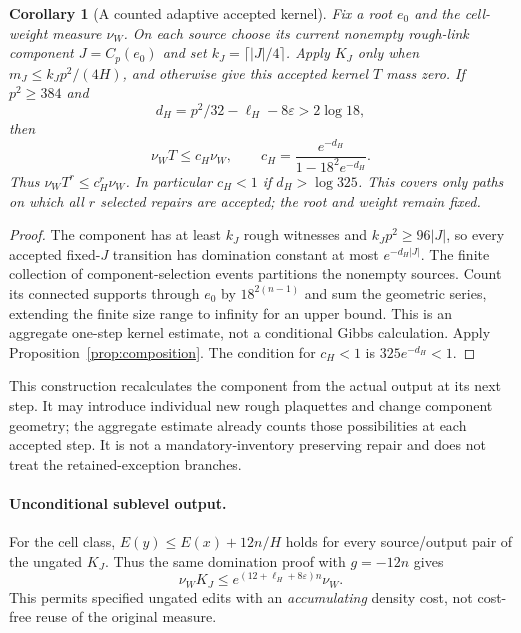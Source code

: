 \documentclass[11pt]{article}
\newtheorem{corollary}[theorem]{Corollary}
\theoremstyle{definition}
\theoremstyle{remark}
\begin{document}
\begin{corollary}[A counted adaptive accepted kernel]\label{cor:adaptive}
Fix a root $e_0$ and the cell-weight measure $\nu_W$. On each source choose
its current nonempty rough-link component $J=C_p(e_0)$ and set
$k_J=\lceil|J|/4\rceil$. Apply $K_J$ only when
$m_J\le k_Jp^2/(4H)$, and otherwise give this accepted kernel $T$ mass
zero. If $p^2\ge384$ and
\[
 d_H=p^2/32-\ell_H-8\varepsilon>2\log18,
\]
then
\begin{equation}
 \nu_W T\le c_H\nu_W,\qquad
 c_H=\frac{e^{-d_H}}{1-18^2e^{-d_H}}.
 \label{eq:adaptive}
\end{equation}
Thus $\nu_WT^r\le c_H^r\nu_W$. In particular $c_H<1$ if
$d_H>\log325$. This covers only paths on which all $r$ selected repairs
are accepted; the root and weight remain fixed.
\end{corollary}
\begin{proof}
The component has at least $k_J$ rough witnesses and
$k_Jp^2\ge96|J|$, so every accepted fixed-$J$ transition has domination
constant at most $e^{-d_H|J|}$. The finite collection of component-selection
events partitions the nonempty sources. Count its connected supports
through $e_0$ by $18^{2(n-1)}$ and sum the geometric series, extending the
finite size range to infinity for an upper bound. This is an aggregate
one-step kernel estimate, not a conditional Gibbs calculation. Apply
Proposition~\ref{prop:composition}. The condition for $c_H<1$ is
$325e^{-d_H}<1$.
\end{proof}
This construction recalculates the component from the actual output at
its next step. It may introduce individual new rough plaquettes and
change component geometry; the aggregate estimate already counts those
possibilities at each accepted step. It is not a mandatory-inventory
preserving repair and does not treat the retained-exception branches.

\paragraph{Unconditional sublevel output.}
For the cell class, $E(y)\le E(x)+12n/H$ holds for every source/output
pair of the ungated $K_J$. Thus the same domination proof with $g=-12n$
gives
\begin{equation}
 \nu_WK_J\le e^{(12+\ell_H+8\varepsilon)n}\nu_W.
 \label{eq:ungated}
\end{equation}
This permits specified ungated edits with an \emph{accumulating} density
cost, not cost-free reuse of the original measure.
\end{document}
